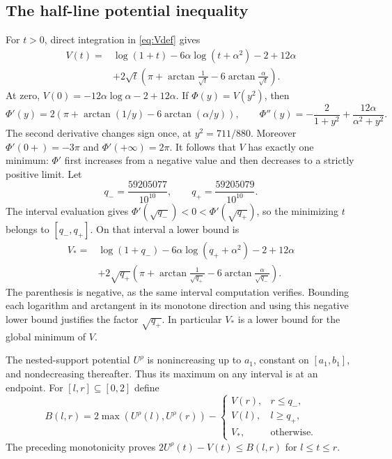 \subsection{The half-line potential inequality}
For $t>0$, direct integration in \eqref{eq:Vdef} gives
\begin{equation}\label{eq:Vexplicit}
\begin{split}
 V(t)={}&\log(1+t)-6\alpha\log(t+\alpha^2)-2+12\alpha\\
 &+2\sqrt t\left(\pi+\arctan\frac1{\sqrt t}
                         -6\arctan\frac\alpha{\sqrt t}\right).
\end{split}
\end{equation}
At zero, $V(0)=-12\alpha\log\alpha-2+12\alpha$. If
$\Phi(y)=V(y^2)$, then
\[
 \Phi'(y)=2(\pi+\arctan(1/y)-6\arctan(\alpha/y)),\qquad
 \Phi''(y)=-\frac2{1+y^2}+\frac{12\alpha}{\alpha^2+y^2}.
\]
The second derivative changes sign once, at $y^2=711/880$.
Moreover $\Phi'(0+)=-3\pi$ and $\Phi'(+\infty)=2\pi$.
It follows that $V$ has exactly one minimum: $\Phi'$ first increases
from a negative value and then decreases to a strictly positive limit.
Let
\[
 q_- =\frac{59205077}{10^{10}},\qquad
 q_+ =\frac{59205079}{10^{10}}.
\]
The interval evaluation gives
$\Phi'(\sqrt{q_-})<0<\Phi'(\sqrt{q_+})$, so the minimizing $t$ belongs
to $[q_-,q_+]$. On that interval a lower bound is
\begin{equation}\label{eq:Vstar}
\begin{split}
 V_*={}&\log(1+q_-)-6\alpha\log(q_++\alpha^2)-2+12\alpha\\
 &+2\sqrt{q_+}\left(\pi+\arctan\frac1{\sqrt{q_+}}
                         -6\arctan\frac\alpha{\sqrt{q_-}}\right).
\end{split}
\end{equation}
The parenthesis is negative, as the same interval computation verifies.
Bounding each logarithm and arctangent in its monotone direction and
using this negative lower bound justifies the factor $\sqrt{q_+}$.
In particular $V_*$ is a lower bound for the global minimum of $V$.

The nested-support potential $U^\rho$ is nonincreasing up to $a_1$,
constant on $[a_1,b_1]$, and nondecreasing thereafter. Thus its maximum
on any interval is at an endpoint. For $[l,r]\subseteq[0,2]$ define
\begin{equation}\label{eq:Bcell}
 B(l,r)=2\max(U^\rho(l),U^\rho(r))-
 \begin{cases}
 V(r),&r\le q_-,\\
 V(l),&l\ge q_+,\\
 V_*,&\text{otherwise}.
 \end{cases}
\end{equation}
The preceding monotonicity proves
$2U^\rho(t)-V(t)\le B(l,r)$ for $l\le t\le r$.

